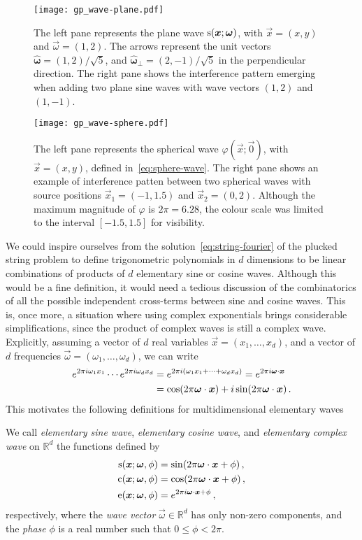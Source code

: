 \begin{figure}[t]
  \centering
  \texttt{[image: gp\_wave-plane.pdf]}
  \caption{The left pane represents the plane wave $\sw(\vec{x};\vec{\omega})$, with
    $\vec{x}=(x,y)$ and $\vec{\omega}=(1,2)$. The arrows represent the unit vectors
    $\hat{\bm{\omega}}=(1,2)/\sqrt{5}$, and $\hat{\bm{\omega}}_{\perp}=(2,-1)/\sqrt{5}$ in
    the perpendicular direction. The right pane shows the interference pattern emerging
  when adding two plane sine waves with wave vectors $(1,2)$ and $(1,-1)$.}
  \label{fig:plane-wave}
\end{figure}
\begin{figure}[t]
  \centering
  \texttt{[image: gp\_wave-sphere.pdf]}
  \caption{The left pane represents the spherical wave $\varphi(\vec{x};\vec{0})$, with
    $\vec{x}=(x,y)$, defined in~\cref{eq:sphere-wave}. The right pane shows an example of
    interference patten between two spherical waves with source positions
    $\vec{x}_1=(-1,1.5)$ and $\vec{x}_2=(0,2)$. Although the maximum magnitude of $\varphi$
    is $2\pi=6.28$, the colour scale was limited to the interval $[-1.5,1.5]$ for
  visibility.}
  \label{fig:sphere-wave}
\end{figure}
We could inspire ourselves from the solution~\cref{eq:string-fourier} of the plucked
string problem to define trigonometric polynomials in $d$ dimensions to be linear
combinations of products of $d$ elementary sine or cosine waves. Although this would be a
fine definition, it would need a tedious discussion of the combinatorics of all the
possible independent cross-terms between sine and cosine waves. This is, once more, a
situation where using complex exponentials brings considerable simplifications, since the
product of complex waves is still a complex wave. Explicitly, assuming a vector of $d$
real variables $\vec{x}=(x_1,\dots,x_d)$, and a vector of $d$ frequencies
$\vec{\omega}=(\omega_1,\dots,\omega_d)$, we can write
\begin{align}
  e^{2\pi i\omega_1x_1}\cdots e^{2\pi i\omega_dx_d}
  &=e^{2\pi i(\omega_1x_1+\cdots+\omega_dx_d)}=e^{2\pi i\vec{\omega}\cdotp\vec{x}}\notag\\
  &=\cos(2\pi\vec{\omega}\cdot\vec{x})+i\sin(2\pi\vec{\omega}\cdot\vec{x})\,.
\end{align}
This motivates the following definitions for multidimensional elementary waves
\begin{definition}
  \label{def:multidim-waves}
  We call \emph{elementary sine wave}, \emph{elementary cosine wave}, and \emph{elementary
  complex wave} on $\mathbb{R}^d$ the functions defined by
  \begin{align}
    \sw(\vec{x};\vec{\omega},\phi)&=\sin(2\pi\vec{\omega}\cdot\vec{x}+\phi)\,,\\
    \cw(\vec{x};\vec{\omega},\phi)&=\cos(2\pi\vec{\omega}\cdot\vec{x}+\phi)\,,\\
    \ew(\vec{x};\vec{\omega},\phi)&=e^{2\pi i\vec{\omega}\cdotp\vec{x}+\phi}\,,
  \end{align}
  respectively, where the \emph{wave vector} $\vec{\omega}\in\mathbb{R}^d$ has only
  non-zero components, and the \emph{phase} $\phi$ is a real number such that $0\leq \phi
  <2\pi$.
\end{definition}
